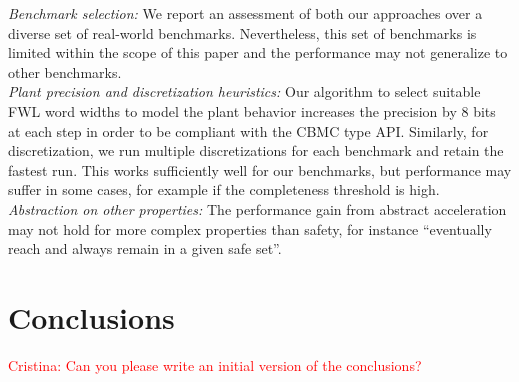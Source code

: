 \documentclass[twocolumn]{autart}    %
\newcommand{\addtodo}[1]{\textcolor{red}{[#1]}}
\begin{document}
\textit{Benchmark selection:} We report an assessment of both our approaches
over a diverse set of real-world benchmarks.  Nevertheless, this set of
benchmarks is limited within the scope of this paper and the performance may
not generalize to other benchmarks.\\
%
\textit{Plant precision and discretization heuristics:} Our algorithm to
select suitable FWL word widths to model the plant behavior 
increases the precision by 8 bits at each step 
in order to be compliant with the CBMC type API. 
Similarly, for discretization, we run multiple discretizations for each
benchmark and retain the fastest run.
This works sufficiently well for our benchmarks, but
performance may suffer in some cases, for example if the completeness
threshold is high.\\
%
\textit{Abstraction on other properties:} The performance gain from abstract
acceleration may not hold for more complex properties than safety, for
instance ``eventually reach and always remain in a given safe set''.

\section{Conclusions}
\label{sec:conclusions}

\textcolor{red}{Cristina: Can you please write an initial version of the conclusions?}




\end{document}
